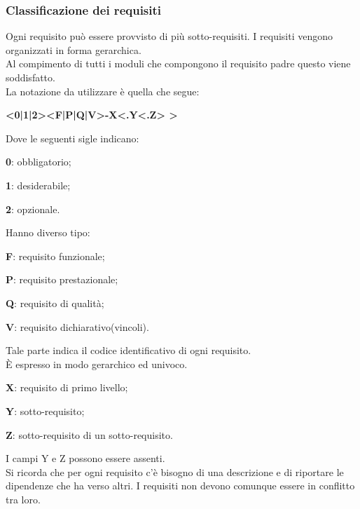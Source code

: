 \documentclass[12pt,a4paper,titlepage]{article}
\begin{document}
\subsubsection{Classificazione dei requisiti}
Ogni requisito può essere provvisto di più sotto-requisiti. I requisiti vengono organizzati in forma gerarchica.\\
Al compimento di tutti i moduli che compongono il requisito padre questo viene soddisfatto.\\
La notazione da utilizzare è quella che segue:
\begin{center}
\textbf{ <0|1|2><F|P|Q|V>-X<.Y<.Z> > }
\end{center}
Dove le seguenti sigle indicano:
\begin{trivlist}
	\item \textbf{0}: obbligatorio;
	\item \textbf{1}: desiderabile;
	\item \textbf{2}: opzionale.
\end{trivlist} 
Hanno diverso tipo:
\begin{trivlist}
	\item \textbf{F}: requisito funzionale;
	\item \textbf{P}: requisito prestazionale;
	\item \textbf{Q}: requisito di qualità;
	\item \textbf{V}: requisito dichiarativo(vincoli).
\end{trivlist} 
Tale parte indica il codice identificativo di ogni requisito.\\
È espresso in modo gerarchico ed univoco.
\begin{trivlist}
	\item \textbf{X}: requisito di primo livello;
	\item \textbf{Y}: sotto-requisito;
	\item \textbf{Z}: sotto-requisito di un sotto-requisito.
\end{trivlist} 
I campi Y e Z possono essere assenti.\\
Si ricorda che per ogni requisito c'è bisogno di una descrizione e di riportare le dipendenze che ha verso altri. I requisiti non devono comunque essere in conflitto tra loro.
\end{document}
